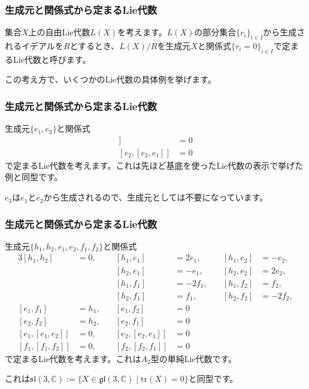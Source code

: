 \documentclass{beamer}
\begin{document}
\begin{frame}
    \frametitle{生成元と関係式から定まるLie代数}

    \begin{definition}[生成元と関係式から定まるLie代数]
        集合$X$上の自由Lie代数$L(X)$を考えます。$L(X)$の部分集合$\{r_i\}_{i∈I}$から生成されるイデアルを$R$とするとき、$L(X)/R$を生成元$X$と関係式$\{r_i=0\}_{i∈I}$で定まるLie代数と呼びます。
    \end{definition}

    この考え方で、いくつかのLie代数の具体例を挙げます。
\end{frame}

\begin{frame}
    \frametitle{生成元と関係式から定まるLie代数}

    \begin{example}[$A_2$型の単純Lie代数の部分Lie代数]
        生成元$\{e_1,e_2\}$と関係式
        \begin{align}
            [e_1,[e_1,e_2]] & =0 \\
            [e_2,[e_2,e_1]] & =0
        \end{align}
        で定まるLie代数を考えます。これは先ほど基底を使ったLie代数の表示で挙げた例と同型です。
    \end{example}

    $e_3$は$e_1$と$e_2$から生成されるので、生成元としては不要になっています。
\end{frame}

\begin{frame}
    \frametitle{生成元と関係式から定まるLie代数}

    \begin{example}[$A_2$型の単純Lie代数]
        生成元$\{h_1,h_2,e_1,e_2,f_1,f_2\}$と関係式
        \begin{alignat}{3}
            [h_1,h_2]       & =0,   & \quad [h_1,e_1]       & =2e_1,  & \quad [h_1,e_2] & =-e_2,  \\
                            &       & \quad [h_2,e_1]       & =-e_1,  & \quad [h_2,e_2] & =2e_2,  \\
                            &       & \quad [h_1,f_1]       & =-2f_1, & \quad [h_1,f_2] & =f_2,   \\
                            &       & \quad [h_2,f_1]       & =f_1,   & \quad [h_2,f_2] & =-2f_2, \\
            [e_1,f_1]       & =h_1, & \quad [e_1,f_2]       & =0                                  \\
            [e_2,f_2]       & =h_2, & \quad [e_2,f_1]       & =0                                  \\
            [e_1,[e_1,e_2]] & =0,   & \quad [e_2,[e_2,e_1]] & =0                                  \\
            [f_1,[f_1,f_2]] & =0,   & \quad [f_2,[f_2,f_1]] & =0
        \end{alignat}
        で定まるLie代数を考えます。これは$A_2$型の単純Lie代数です。
    \end{example}

    これは$\mathfrak{sl}(3,ℂ):=\{X∈\mathfrak{gl}(3,ℂ)\mid\mathrm{tr}(X)=0\}$と同型です。
\end{frame}
\end{document}
